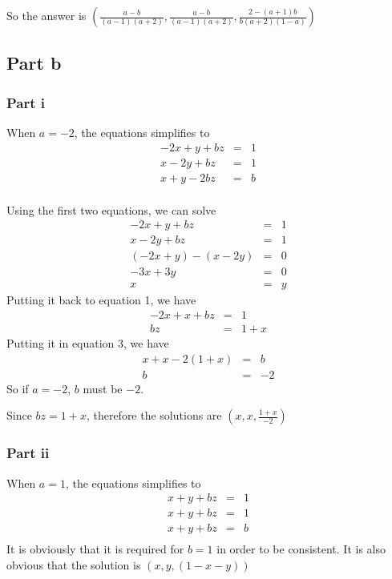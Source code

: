 So the answer is $ \left(\frac{a - b}{(a-1)(a+2)}, \frac{a - b}{(a-1)(a+2)}, \frac{2 - (a+1)b}{b(a + 2)(1 - a)} \right)$

\subsection*{Part b}
\subsubsection*{Part i}
When $ a = -2 $, the equations simplifies to
\begin{eqnarray*}
  -2x + y + bz &=& 1 \\
   x - 2y + bz &=& 1 \\
   x + y  -2bz &=& b \\
\end{eqnarray*}

Using the first two equations, we can solve 
\begin{eqnarray*}
  -2x + y + bz &=& 1 \\
   x - 2y + bz &=& 1 \\
  (-2x + y) - (x - 2y) &=& 0 \\
  -3x + 3y &=& 0 \\
  x &=& y
\end{eqnarray*}
Putting it back to equation 1, we have 
\begin{eqnarray*}
  -2x + x + bz &=& 1 \\
            bz &=& 1 + x
\end{eqnarray*}
Putting it in equation 3, we have
\begin{eqnarray*}
  x + x -2 (1 + x) &=& b \\
  b &=& -2
\end{eqnarray*}
So if $ a = -2 $, $ b $ must be $ -2 $. 

Since $ bz = 1 + x $, therefore the solutions are $ (x, x, \frac{1+x}{-2}) $
\subsubsection*{Part ii}
When $ a = 1 $, the equations simplifies to
\begin{eqnarray*}
  x + y + bz &=& 1 \\
  x + y + bz &=& 1 \\
  x + y + bz &=& b \\
\end{eqnarray*}
It is obviously that it is required for $ b = 1 $ in order to be consistent. It is also obvious that the solution is  $ (x, y, (1- x - y)) $

